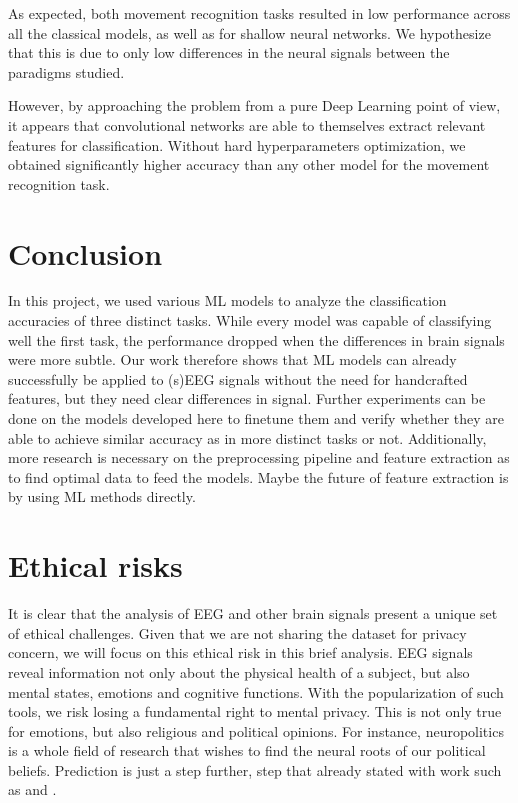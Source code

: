 \documentclass[10pt,conference,compsocconf]{IEEEtran}
\begin{document}
As expected, both movement recognition tasks resulted in low performance across all the classical models, as well as for shallow neural networks. We hypothesize that this is due to only low differences in the neural signals between the paradigms studied.

However, by approaching the problem from a pure Deep Learning point of view, it appears that convolutional networks are able to themselves extract relevant features for classification. Without hard hyperparameters optimization, we obtained significantly higher accuracy than any other model for the movement recognition task.

\section{Conclusion}
\label{sec:conclusion}
In this project, we used various ML models to analyze the classification accuracies of three distinct tasks. While every model was capable of classifying well the first task, the performance dropped when the differences in brain signals were more subtle. Our work therefore shows that ML models can already successfully be applied to (s)EEG signals without the need for handcrafted features, but they need clear differences in signal. Further experiments can be done on the models developed here to finetune them and verify whether they are able to achieve similar accuracy as in more distinct tasks or not. Additionally, more research is necessary on the preprocessing pipeline and feature extraction as to find optimal data to feed the models. Maybe the future of feature extraction is by using ML methods directly.

\newpage
\section{Ethical risks}
It is clear that the analysis of EEG and other brain signals present a unique set of ethical challenges. Given that we are not sharing the dataset for privacy concern, we will focus on this ethical risk in this brief analysis. EEG signals reveal information not only about the physical health of a subject, but also mental states, emotions and cognitive functions. With the popularization of such tools, we risk losing a fundamental right to mental privacy. This is not only true for emotions, but also religious and political opinions. For instance, neuropolitics\cite{neuropolitics} is a whole field of research that wishes to find the neural roots of our political beliefs. Prediction is just a step further, step that already stated with work such as \cite{galli_early_2021} and \cite{yun_erp_2022}.
\end{document}
